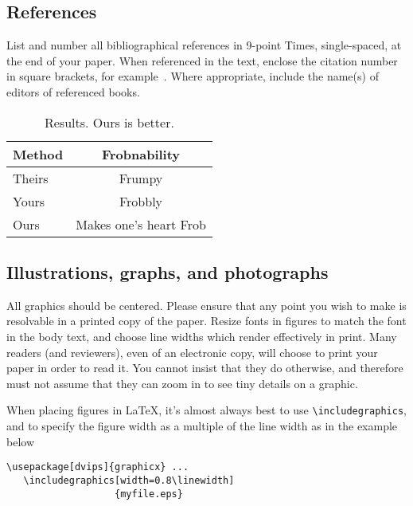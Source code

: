 \documentclass[10pt,twocolumn,letterpaper]{article}
\begin{document}
\subsection{References}

List and number all bibliographical references in 9-point Times, single-spaced,
at the end of your paper. When referenced in the text, enclose the citation
number in square brackets, for example~\cite{Authors14}.  Where appropriate,
include the name(s) of editors of referenced books.

\begin{table}
\begin{center}
\begin{tabular}{|l|c|}
\hline
Method & Frobnability \\
\hline\hline
Theirs & Frumpy \\
Yours & Frobbly \\
Ours & Makes one's heart Frob\\
\hline
\end{tabular}
\end{center}
\caption{Results.   Ours is better.}
\end{table}

\subsection{Illustrations, graphs, and photographs}

All graphics should be centered.  Please ensure that any point you wish to make
is resolvable in a printed copy of the paper.  Resize fonts in figures to match
the font in the body text, and choose line widths which render effectively in
print.  Many readers (and reviewers), even of an electronic copy, will choose to
print your paper in order to read it.  You cannot insist that they do otherwise,
and therefore must not assume that they can zoom in to see tiny details on a
graphic.

When placing figures in \LaTeX, it's almost always best to use
\verb+\includegraphics+, and to specify the  figure width as a multiple of the
line width as in the example below {\small\begin{verbatim}
\usepackage[dvips]{graphicx} ...
   \includegraphics[width=0.8\linewidth]
                   {myfile.eps}
\end{verbatim}
}


{\small


}
\end{document}
